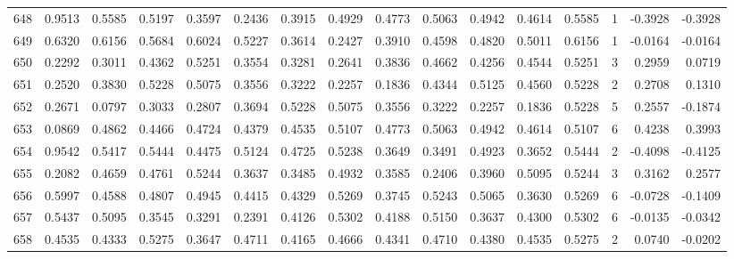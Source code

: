 \begin{tabular}{lrrrrrrrrrrrrrrr}
648 &      0.9513 &  0.5585 &  0.5197 &  0.3597 &  0.2436 &  0.3915 &  0.4929 &  0.4773 &  0.5063 &  0.4942 &   0.4614 &     0.5585 &      1 &                   -0.3928 &                    -0.3928 \\
649 &      0.6320 &  0.6156 &  0.5684 &  0.6024 &  0.5227 &  0.3614 &  0.2427 &  0.3910 &  0.4598 &  0.4820 &   0.5011 &     0.6156 &      1 &                   -0.0164 &                    -0.0164 \\
650 &      0.2292 &  0.3011 &  0.4362 &  0.5251 &  0.3554 &  0.3281 &  0.2641 &  0.3836 &  0.4662 &  0.4256 &   0.4544 &     0.5251 &      3 &                    0.2959 &                     0.0719 \\
651 &      0.2520 &  0.3830 &  0.5228 &  0.5075 &  0.3556 &  0.3222 &  0.2257 &  0.1836 &  0.4344 &  0.5125 &   0.4560 &     0.5228 &      2 &                    0.2708 &                     0.1310 \\
652 &      0.2671 &  0.0797 &  0.3033 &  0.2807 &  0.3694 &  0.5228 &  0.5075 &  0.3556 &  0.3222 &  0.2257 &   0.1836 &     0.5228 &      5 &                    0.2557 &                    -0.1874 \\
653 &      0.0869 &  0.4862 &  0.4466 &  0.4724 &  0.4379 &  0.4535 &  0.5107 &  0.4773 &  0.5063 &  0.4942 &   0.4614 &     0.5107 &      6 &                    0.4238 &                     0.3993 \\
654 &      0.9542 &  0.5417 &  0.5444 &  0.4475 &  0.5124 &  0.4725 &  0.5238 &  0.3649 &  0.3491 &  0.4923 &   0.3652 &     0.5444 &      2 &                   -0.4098 &                    -0.4125 \\
655 &      0.2082 &  0.4659 &  0.4761 &  0.5244 &  0.3637 &  0.3485 &  0.4932 &  0.3585 &  0.2406 &  0.3960 &   0.5095 &     0.5244 &      3 &                    0.3162 &                     0.2577 \\
656 &      0.5997 &  0.4588 &  0.4807 &  0.4945 &  0.4415 &  0.4329 &  0.5269 &  0.3745 &  0.5243 &  0.5065 &   0.3630 &     0.5269 &      6 &                   -0.0728 &                    -0.1409 \\
657 &      0.5437 &  0.5095 &  0.3545 &  0.3291 &  0.2391 &  0.4126 &  0.5302 &  0.4188 &  0.5150 &  0.3637 &   0.4300 &     0.5302 &      6 &                   -0.0135 &                    -0.0342 \\
658 &      0.4535 &  0.4333 &  0.5275 &  0.3647 &  0.4711 &  0.4165 &  0.4666 &  0.4341 &  0.4710 &  0.4380 &   0.4535 &     0.5275 &      2 &                    0.0740 &                    -0.0202 \\

\end{tabular}
